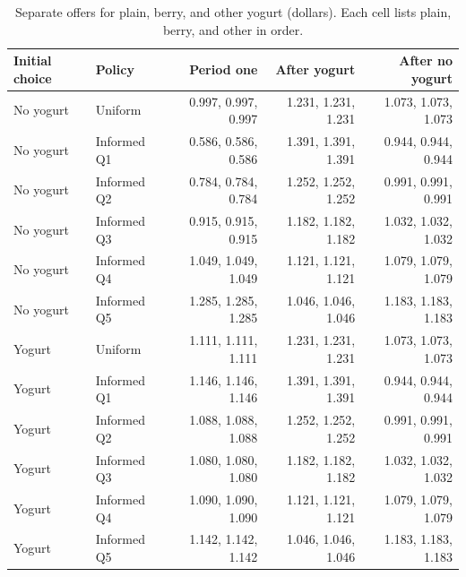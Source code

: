\begin{table}[htbp]
\centering\small
\caption{Separate offers for plain, berry, and other yogurt (dollars). Each cell lists plain, berry, and other in order.}
\label{tab:weekly-separate-offers}
\begin{tabular}{llrrr}
\toprule
Initial choice & Policy & Period one & After yogurt & After no yogurt \\
\midrule
No yogurt & Uniform & 0.997, 0.997, 0.997 & 1.231, 1.231, 1.231 & 1.073, 1.073, 1.073 \\
No yogurt & Informed Q1 & 0.586, 0.586, 0.586 & 1.391, 1.391, 1.391 & 0.944, 0.944, 0.944 \\
No yogurt & Informed Q2 & 0.784, 0.784, 0.784 & 1.252, 1.252, 1.252 & 0.991, 0.991, 0.991 \\
No yogurt & Informed Q3 & 0.915, 0.915, 0.915 & 1.182, 1.182, 1.182 & 1.032, 1.032, 1.032 \\
No yogurt & Informed Q4 & 1.049, 1.049, 1.049 & 1.121, 1.121, 1.121 & 1.079, 1.079, 1.079 \\
No yogurt & Informed Q5 & 1.285, 1.285, 1.285 & 1.046, 1.046, 1.046 & 1.183, 1.183, 1.183 \\
\addlinespace
Yogurt & Uniform & 1.111, 1.111, 1.111 & 1.231, 1.231, 1.231 & 1.073, 1.073, 1.073 \\
Yogurt & Informed Q1 & 1.146, 1.146, 1.146 & 1.391, 1.391, 1.391 & 0.944, 0.944, 0.944 \\
Yogurt & Informed Q2 & 1.088, 1.088, 1.088 & 1.252, 1.252, 1.252 & 0.991, 0.991, 0.991 \\
Yogurt & Informed Q3 & 1.080, 1.080, 1.080 & 1.182, 1.182, 1.182 & 1.032, 1.032, 1.032 \\
Yogurt & Informed Q4 & 1.090, 1.090, 1.090 & 1.121, 1.121, 1.121 & 1.079, 1.079, 1.079 \\
Yogurt & Informed Q5 & 1.142, 1.142, 1.142 & 1.046, 1.046, 1.046 & 1.183, 1.183, 1.183 \\
\bottomrule
\end{tabular}
\end{table}
